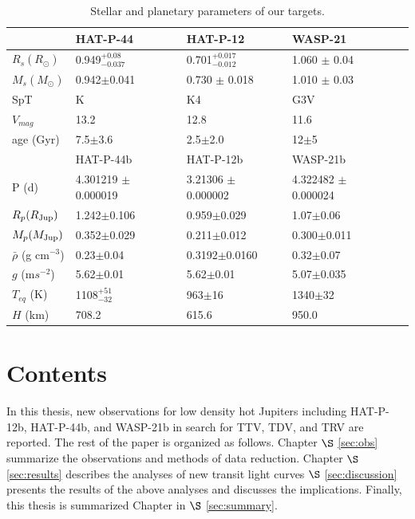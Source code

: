 \begin{table}
\centering
\caption{Stellar and planetary parameters of our targets.}
\label{tab:params}
\begin{tabular}{lllll} \hline
          &HAT-P-44      &HAT-P-12        &WASP-21   \\ \hline
$R_s (R_{\odot})$     &0.949$^{+0.08}_{-0.037}$&0.701$^{+0.017}_{-0.012}$ & 1.060 $\pm$ 0.04 \\
$M_s (M_{\odot})$    &0.942$\pm$0.041   &0.730 $\pm$ 0.018 &1.010 $\pm$ 0.03 \\ 
SpT  & K & K4  & G3V \\
$V_{mag}$ &13.2              &12.8            &11.6               \\
age (Gyr) &7.5$\pm$3.6       &2.5$\pm$2.0     &12$\pm$5           \\ \hline
 &HAT-P-44b      &HAT-P-12b        &WASP-21b    \\ \hline
P (d) & 4.301219 $\pm$ 0.000019  & 3.21306 $\pm$ 0.000002    &  4.322482 $\pm$ 0.000024 \\
$R_p (R_{\rm{Jup}})$&      1.242$\pm$0.106  & 0.959$\pm$0.029& 1.07$\pm$0.06 \\
$M_p  (M_{\rm{Jup}})$ &   0.352$\pm$0.029   & 0.211$\pm$0.012 & 0.300$\pm$0.011 \\
$\bar \rho$  (g cm$^{-3}$) &  0.23$\pm$0.04   &0.3192$\pm$0.0160   & 0.32$\pm$0.07    \\ %
$g$  (m$s^{-2}$) & 5.62$\pm$0.01   & 5.62$\pm$0.01 & 5.07$\pm$0.035 \\ 
$T_{eq}$  (K) & 1108$^{+51}_{-32}$   & 963$\pm$16   & 1340$\pm$32  \\
$H$ (km) & 708.2 & 615.6 & 950.0 \\
\hline
\end{tabular}
\end{table}

\section{Contents}
In this thesis, new observations for low density hot Jupiters including HAT-P-12b, HAT-P-44b, and WASP-21b in search for TTV, TDV, and TRV are reported. %
The rest of the paper is organized as follows. Chapter $\S$ \ref{sec:obs} summarize the observations and methods of data reduction. Chapter $\S$ \ref{sec:results} describes the analyses of new transit light curves %
$\S$ \ref{sec:discussion} presents the results of the above analyses and discusses the implications. Finally, this thesis is summarized Chapter in $\S$ \ref{sec:summary}.